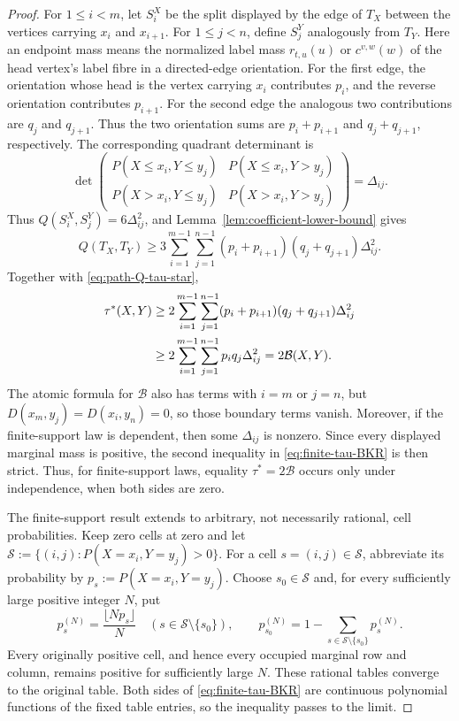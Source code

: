 \documentclass[pdflatex,sn-mathphys-num]{sn-jnl}
\theoremstyle{thmstyleone}
\begin{document}
\begin{proof}
For $1\le i<m$, let $S_i^X$ be the split displayed by the edge of $T_X$
between the vertices carrying $x_i$ and $x_{i+1}$.  For $1\le j<n$, define
$S_j^Y$ analogously from $T_Y$.  Here an endpoint mass means the normalized
label mass $r_{t,u}(u)$ or $c^{v,w}(w)$ of the head vertex's label fibre in a
directed-edge orientation.  For the first edge, the orientation whose head is
the vertex carrying $x_i$ contributes $p_i$, and the reverse orientation
contributes $p_{i+1}$.  For the second edge the analogous two contributions
are $q_j$ and $q_{j+1}$.  Thus the two orientation sums are
$p_i+p_{i+1}$ and $q_j+q_{j+1}$, respectively.  The corresponding quadrant
determinant is
\[
\det\begin{pmatrix}
P(X\le x_i,Y\le y_j)&P(X\le x_i,Y>y_j)\\
P(X>x_i,Y\le y_j)&P(X>x_i,Y>y_j)
\end{pmatrix}=\Delta_{ij}.
\]
Thus $Q(S_i^X,S_j^Y)=6\Delta_{ij}^2$, and
Lemma~\ref{lem:coefficient-lower-bound} gives
\[
Q(T_X,T_Y)\ge
3\sum_{i=1}^{m-1}\sum_{j=1}^{n-1}
(p_i+p_{i+1})(q_j+q_{j+1})\Delta_{ij}^2.
\]
Together with \eqref{eq:path-Q-tau-star},
\begin{align}
\tau^*(X,Y)
&\ge2\sum_{i=1}^{m-1}\sum_{j=1}^{n-1}
(p_i+p_{i+1})(q_j+q_{j+1})\Delta_{ij}^2\notag\\
&\ge2\sum_{i=1}^{m-1}\sum_{j=1}^{n-1}p_iq_j\Delta_{ij}^2
=2\mathcal B(X,Y).                                      \label{eq:finite-tau-BKR}
\end{align}
The atomic formula for $\mathcal B$ also has terms with $i=m$ or $j=n$,
but $D(x_m,y_j)=D(x_i,y_n)=0$, so those boundary terms vanish.
Moreover, if the finite-support law is dependent, then some
$\Delta_{ij}$ is nonzero.  Since every displayed marginal mass is positive,
the second inequality in \eqref{eq:finite-tau-BKR} is then strict.  Thus, for
finite-support laws, equality $\tau^*=2\mathcal B$ occurs only under
independence, when both sides are zero.

The finite-support result extends to arbitrary, not necessarily rational,
cell probabilities.  Keep
zero cells at zero and let
$\mathcal S:=\{(i,j):P(X=x_i,Y=y_j)>0\}$.
For a cell $s=(i,j)\in\mathcal S$, abbreviate its probability by
$p_s:=P(X=x_i,Y=y_j)$.  Choose $s_0\in\mathcal S$ and, for every sufficiently
large positive integer $N$, put
\[
p_s^{(N)}=\frac{\lfloor Np_s\rfloor}{N}
\quad(s\in\mathcal S\setminus\{s_0\}),
\qquad
p_{s_0}^{(N)}=1-\sum_{s\in\mathcal S\setminus\{s_0\}}p_s^{(N)}.
\]
Every originally positive cell, and hence every occupied marginal row
and column, remains positive for sufficiently large $N$.  These rational
tables converge to the original table.  Both sides of
\eqref{eq:finite-tau-BKR} are continuous polynomial functions of the
fixed table entries, so the inequality passes to the limit.


\end{proof}
\end{document}
